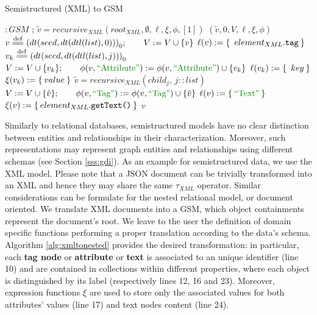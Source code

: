 \begin{algorithm}[!t]
	\caption{Semistructured (XML) to GSM}\label{alg:xmltonested}
	{
		\begin{minipage}{\linewidth}
			\begin{algorithmic}[1]
				 $\colon GSM$ 
				;
				\State $\tilde{v} = recursive_{XML}(root_{XML},\emptyset,\ell,\xi,\phi,[1])$
				\State \Return $(\tilde{v},0,V,\ell,\xi,\phi)$
				\EndFunction
				\State
				\State $v\overset{\mathrm{def}}{=\mathrel{\mkern-3mu}=} {(dt(seed,dt(dtl(list), 0)))}_0;\qquad V:=V\cup \{v\}$
					\State $\ell(v):=\Set{\;element_{XML}.\texttt{tag}}$
						\State $v_k\overset{\mathrm{def}}{=\mathrel{\mkern-3mu}=} {(dt(seed,dt(dtl(list),j)))}_0$
						\State $V:=V\cup \{v_k\};\qquad \phi(v,\ATTR):=\phi(v,\ATTR)\cup\{v_k\}$
						\State $\ell(v_k):=\Set{\;key}$
						\State $\xi(v_k):=\Set{value}$
					\EndFor
						\State $\tilde{v}= recursive_{XML}(child_j,\,j:: list)$
						\State $V:=V\cup\{\tilde{v}\};\qquad \phi(v,\mstr{Tag}):=\phi(v,\mstr{Tag})\cup\{\tilde{v}\}$
					\EndFor
				\Else
					\State $\ell(v):=\Set{\mstr{Text}}$
					\State $\xi(v):=\Set{element_{XML}.\texttt{getText()}}$
				\EndIf
				\State \Return $v$
				\EndProcedure
			\end{algorithmic}
	\end{minipage}}
\end{algorithm}
Similarly to relational databases,  semistructured models have no clear distinction between entities and relationships in their characterization. Moreover, such representations may represent graph entities and relationships using different schemas (see Section \vref{sss:gdi}). 
As an example for semistructured data, we use the XML model. Please note that a JSON document can be trivially transformed into an XML and hence they may share the same $\tau_{XML}$ operator.  Similar considerations can be formulate for the nested relational model, or document oriented. We  translate XML documents into a GSM, which object containments represent the document's root. We leave to the user the definition of domain specific functions performing a proper translation according to the data's schema. Algorithm \vref{alg:xmltonested} provides the desired transformation: in particular, each \textbf{tag node} or \textbf{attribute} or \textbf{text} is associated to an unique identifier (line 10) and are contained in collections within different properties, where each object is distinguished by its label (respectively lines 12, 16 and 23). Moreover, expression functions $\xi$ are used to store only the associated values for both attributes' values (line 17) and text nodes content (line 24).
